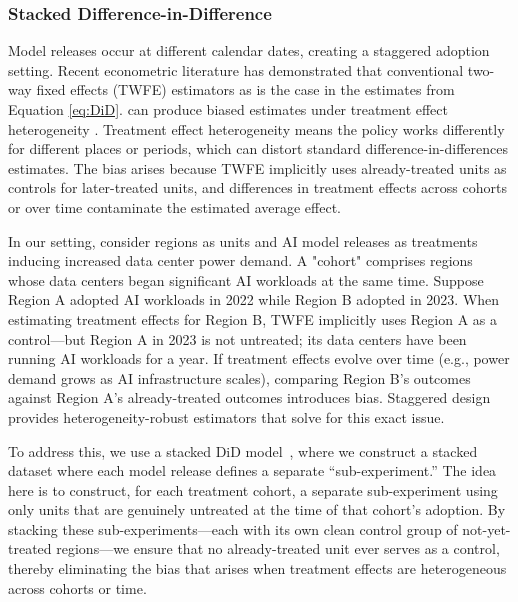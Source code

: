 \documentclass[sigconf]{acmart}
\newcommand{\nb}[1]{\textcolor{blue}{NB[#1]}}
\begin{document}
\subsubsection{Stacked Difference-in-Difference}

Model releases occur at different calendar dates, creating a staggered adoption setting. Recent econometric literature has demonstrated that conventional two-way fixed effects (TWFE) estimators as is the case in the estimates from Equation \ref{eq:DiD}. 
can produce biased estimates under treatment effect heterogeneity 
\cite{goodman2021difference, sun2021treatment, callaway2021difference, borusyak2024revisiting}. Treatment effect heterogeneity means the policy works differently for different places or periods, which can distort standard difference-in-differences estimates. The bias arises because TWFE implicitly uses already-treated units as controls for later-treated units, and differences in treatment effects across cohorts or over time contaminate the estimated average effect. 

In our setting, consider regions as units and AI model releases as treatments inducing increased data center power demand. A "cohort" comprises regions whose data centers began significant AI workloads at the same time. Suppose Region A adopted AI workloads in 2022 while Region B adopted in 2023. When estimating treatment effects for Region B, TWFE implicitly uses Region A as a control—but Region A in 2023 is not untreated; its data centers have been running AI workloads for a year. If treatment effects evolve over time (e.g., power demand grows as AI infrastructure scales), comparing Region B's outcomes against Region A's already-treated outcomes introduces bias. Staggered design provides heterogeneity-robust estimators that solve for this exact issue.


To address this, we use a stacked DiD model~\cite{cengiz2019effect, deshpande2019screened}, where we construct a stacked dataset where each model release defines a separate ``sub-experiment.'' The idea here is to construct, for each treatment cohort, a separate sub-experiment using only units that are genuinely untreated at the time of that cohort's adoption. By stacking these sub-experiments—each with its own clean control group of not-yet-treated regions—we ensure that no already-treated unit ever serves as a control, thereby eliminating the bias that arises when treatment effects are heterogeneous across cohorts or time.
\end{document}
